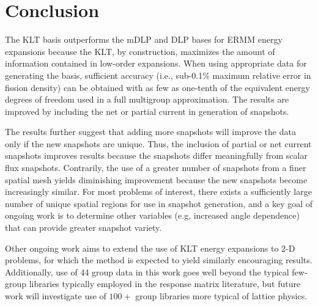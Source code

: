 \documentclass{anstrans}
\begin{document}
\section{Conclusion}

The KLT basis outperforms the mDLP and DLP bases for ERMM energy expansions because the KLT, by construction, maximizes the amount of information contained in low-order expansions. When using appropriate data for generating the basis, sufficient accuracy (i.e., sub-0.1\% maximum relative error in fission density) can be obtained with as few as one-tenth of the equivalent energy degrees of freedom used in a full multigroup approximation. The results are improved by including the net or partial current in generation of snapshots.

The results further suggest that adding more snapshots will improve the data only if the new snapshots are unique.  Thus, the inclusion of partial or net current snapshots improves results because the snapshots differ meaningfully from scalar flux snapshots.  Contrarily, the use of a greater number of snapshots from a finer spatial mesh yields diminishing improvement because the new snapshots become increasingly similar.  For most problems of interest, there exists a sufficiently large number of unique spatial regions for use in snapshot generation, and a key goal of ongoing work is to determine other variables (e.g, increased angle dependence) that can provide greater snapshot variety.

Other ongoing work aims to extend the use of KLT energy expansions to 2-D problems, for which the method is expected to yield similarly encouraging results.  Additionally, use of 44 group data in this work goes well beyond the typical few-group libraries typically employed in the response matrix literature, but future work will investigate use of $100+$ group libraries more typical of lattice physics.

\setlength{\baselineskip}{12pt}



\end{document}
